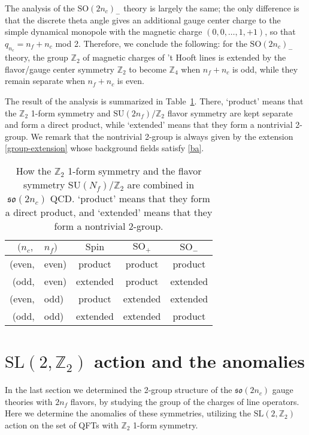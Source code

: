 \documentclass[12pt]{article}
\numberwithin{equation}{section}
\def\bZ{\mathbb{Z}}
\def\SU{\mathrm{SU}}
\def\SO{\mathrm{SO}}
\def\so{\mathfrak{so}}
\def\Spin{\mathrm{Spin}}
\def\SL{\mathrm{SL}}
\begin{document}
The analysis of the $\SO(2n_c)_-$ theory is largely the same;
the only difference is that the discrete theta angle gives an additional gauge center charge to the simple dynamical monopole with the magnetic charge $(0,0,\ldots,1,+1)$, so that $q_{n_c}=n_f+n_c$ mod 2.
Therefore, we conclude the following:
for the $\SO(2n_c)_-$ theory,
the group $\bZ_2$ of magnetic charges of 't Hooft lines is extended by the flavor/gauge center symmetry $\bZ_2$ to become $\bZ_4$ when $n_f+n_c$ is odd,
while they remain separate when $n_f+n_c$ is even.

The result of the analysis is summarized in Table~\ref{table:2group}.
There, `product' means that the $\bZ_2$ 1-form symmetry and $\SU(2n_f)/\bZ_2$ flavor symmetry are kept separate and form a direct product,
while `extended' means that they form a nontrivial 2-group.
We remark that the nontrivial 2-group is always given by the extension \eqref{group-extension}  whose background fields satisfy \eqref{ba}.

\begin{table}
\centering
\renewcommand{\arraystretch}{1.2}
\begin{tabular}{r@{\,}l|ccc}
$(n_c,$&$n_f)$ & $\Spin$ & $\SO_+$ & $\SO_-$\\
\hline
(even,&even) & product & product & product \\
(odd,&even) & extended & product & extended \\
(even,&odd) & product & extended & extended \\
(odd,&odd) & extended & extended & product
\end{tabular}
\caption{How the $\bZ_2$ 1-form symmetry and the flavor symmetry $\SU(N_f)/\bZ_2$ are combined
in $\so(2n_c)$ QCD.
`product' means that they form a direct product,
and `extended' means that they form a nontrivial 2-group.
\label{table:2group}}
\end{table}

\section{$\SL(2,\bZ_2)$ action and the anomalies}
\label{sec:sl2z}
In the last section we determined the 2-group structure of the $\so(2n_c)$ gauge theories with $2n_f$ flavors, by studying the group of the charges of line operators. 
Here we determine the anomalies of these symmetries, 
utilizing the $\SL(2,\bZ_2)$ action on the set of QFTs with $\bZ_2$ 1-form symmetry.
\end{document}
